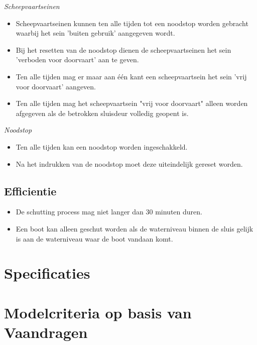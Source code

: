 \documentclass{article}
\begin{document}
        \noindent\textit{Scheepvaartseinen}
        \begin{itemize}
            \item Scheepvaartseinen kunnen ten alle tijden tot een noodstop worden
            gebracht waarbij het sein 'buiten gebruik' aangegeven wordt.
            \item Bij het resetten van de noodstop dienen de scheepvaartseinen
            het sein 'verboden voor doorvaart' aan te geven.
            \item Ten alle tijden mag er maar aan één kant een scheepvaartsein het sein
            'vrij voor doorvaart' aangeven.
            \item Ten alle tijden mag het scheepvaartsein "vrij voor doorvaart" alleen 
            worden afgegeven als de betrokken sluisdeur volledig geopent is.
        \end{itemize}

        \noindent\textit{Noodstop}
        \begin{itemize}
            \item Ten alle tijden kan een noodstop worden ingeschakkeld.
            \item Na het indrukken van de noodstop moet deze uiteindelijk gereset worden.
        \end{itemize}

    \newpage
    \subsection{Efficientie}
        \begin{itemize}
            \item De schutting process mag niet langer dan 30 minuten duren.
            \item Een boot kan alleen geschut worden als de waterniveau binnen de
            sluis gelijk is aan de waterniveau waar de boot vandaan komt.
        \end{itemize}
\newpage
\section {Specificaties}




\section {Modelcriteria op basis van Vaandragen}
\end{document}
